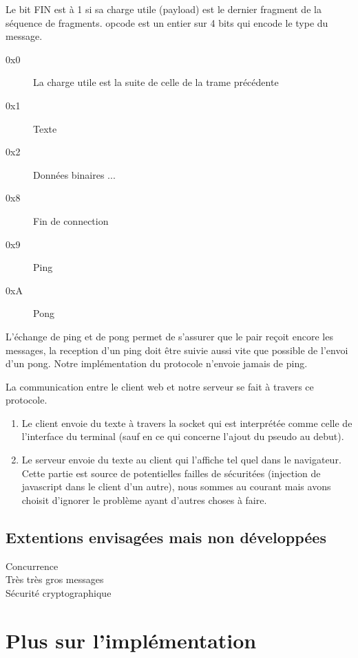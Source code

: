 \documentclass[a4paper,10pt]{article} %
\begin{document}
Le bit \textrm{FIN} est à 1 si sa charge utile (payload) est le dernier fragment de la séquence de fragments. \textrm{opcode} est un entier sur 4 bits qui encode le type du message.

\begin{description}
\item[0x0] La charge utile est la suite de celle de la trame précédente
\item[0x1] Texte
\item[0x2] Données binaires
  ...
\item[0x8] Fin de connection
\item[0x9] Ping
\item[0xA] Pong
\end{description}

L'échange de ping et de pong permet de s'assurer que le pair reçoit encore les messages, la reception d'un ping doit être suivie aussi vite que possible de l'envoi d'un pong. Notre implémentation du protocole n'envoie jamais de ping.

La communication entre le client web et notre serveur se fait à travers ce protocole.
\begin{enumerate}
\item Le client envoie du texte à travers la socket qui est interprétée comme celle de l'interface du terminal (sauf en ce qui concerne l'ajout du pseudo au debut).
\item Le serveur envoie du texte au client qui l'affiche tel quel dans le navigateur. Cette partie est source de potentielles failles de sécuritées (injection de javascript dans le client d'un autre), nous sommes au courant mais avons choisit d'ignorer le problème ayant d'autres choses à faire.
\end{enumerate}

\subsection{Extentions envisagées mais non développées}

\begin{description}
\item[Concurrence] %
\item[Très très gros messages]
\item[Sécurité cryptographique]
\end{description}

\section{Plus sur l'implémentation}
\end{document}
